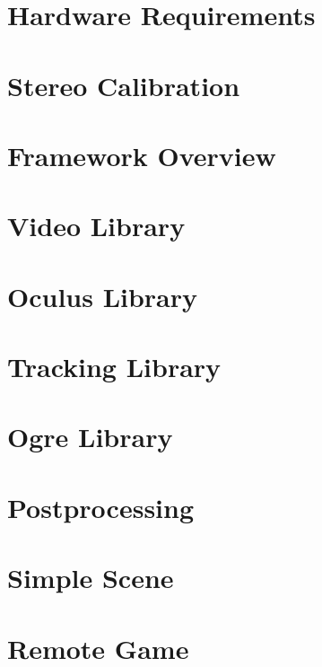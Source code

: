 	\chapter{Hardware Requirements}
	\label{sec:hardware_requirements}
	
	
	\chapter{Stereo Calibration}
	\label{sec:stereo_calibration}
	
	
	\chapter{Framework Overview}
	\label{sec:lib_overview}
	
	
	\chapter{Video Library}
	\label{sec:video_library}
	
	
	\chapter{Oculus Library}
	\label{sec:oculus_library}
	
	
	\chapter{Tracking Library}
	\label{sec:tracking_library}
	
		
	\chapter{Ogre Library}
	\label{sec:ogre_library}
	

	\chapter{Postprocessing}
	\label{sec:postprocessing}
	
	
	\chapter{Simple Scene}
	\label{sec:simple_scene}
	
	
	\chapter{Remote Game}
	\label{sec:remote_game}
	
	
